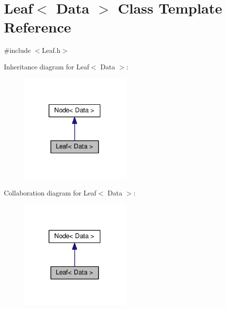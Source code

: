 \hypertarget{classLeaf}{}\section{Leaf$<$ Data $>$ Class Template Reference}
\label{classLeaf}


{\ttfamily \#include $<$Leaf.\+h$>$}



Inheritance diagram for Leaf$<$ Data $>$\+:\nopagebreak
\begin{figure}[H]
\begin{center}
\leavevmode
\includegraphics[width=159pt]{classLeaf__inherit__graph}
\end{center}
\end{figure}


Collaboration diagram for Leaf$<$ Data $>$\+:\nopagebreak
\begin{figure}[H]
\begin{center}
\leavevmode
\includegraphics[width=159pt]{classLeaf__coll__graph}
\end{center}
\end{figure}
